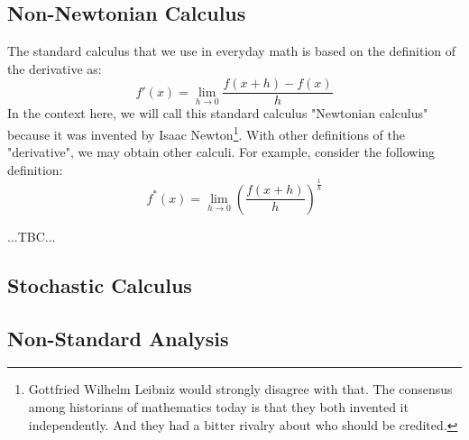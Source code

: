 \subsection{Non-Newtonian Calculus}
The standard calculus that we use in everyday math is based on the definition of the derivative as:
\begin{equation}
  f'(x) = \lim_{h \rightarrow 0} \frac{f(x + h) - f(x)}{h}
\end{equation}
In the context here, we will call this standard calculus "Newtonian calculus" because it was invented by Isaac Newton\footnote{Gottfried Wilhelm Leibniz would strongly disagree with that. The consensus among historians of mathematics today is that they both invented it independently. And they had a bitter rivalry about who should be credited.}. With other definitions of the "derivative", we may obtain other calculi. For example, consider the following definition:
\begin{equation}
  f^*(x) = \lim_{h \rightarrow 0} \left(  \frac{f(x + h)}{h}  \right)^{\frac{1}{h}} 
\end{equation}



...TBC...


% 


\subsection{Stochastic Calculus}


\subsection{Non-Standard Analysis}


